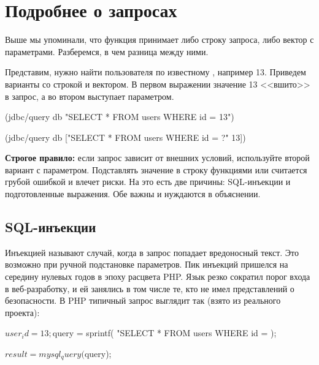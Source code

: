\section{Подробнее о запросах}

Выше мы упоминали, что функция  принимает либо строку запроса, либо вектор с параметрами. Разберемся, в чем разница между ними.


Представим, нужно найти пользователя по известному , например 13. Приведем варианты со строкой и вектором. В первом выражении значение 13 <<вшито>> в запрос, а во втором выступает параметром.

\begin{english}
  \begin{clojure}
(jdbc/query db
            "SELECT * FROM users WHERE id = 13")

(jdbc/query db
            ["SELECT * FROM users WHERE id = ?" 13])
  \end{clojure}
\end{english}

\textbf{Строгое правило:} если запрос зависит от внешних условий, используйте второй вариант с параметром. Подставлять значение в строку функциями  или  считается грубой ошибкой и влечет риски. На это есть две причины: SQL-инъекции и подготовленные выражения. Обе важны и нуждаются в объяснении.

\subsection{SQL-инъекции}


Инъекцией называют случай, когда в запрос попадает вредоносный текст. Это возможно при ручной подстановке параметров. Пик инъекций пришелся на середину нулевых годов в эпоху расцвета PHP. Язык резко сократил порог входа в веб-разработку, и ей занялись в том числе те, кто не имел представлений о безопасности. В PHP типичный запрос выглядит так (взято из реального проекта):


\begin{english}
  \begin{php}
$user_id = 13;

$query = sprintf(
  "SELECT * FROM users WHERE id = %
);

$result = mysql_query($query);
  \end{php}
\end{english}

